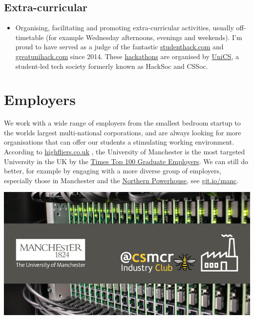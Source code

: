 \documentclass[12pt,]{book}
\providecommand{\tightlist}{%
  \setlength{\itemsep}{0pt}\setlength{\parskip}{0pt}}
\begin{document}
\hypertarget{extra-curricular}{%
\section{Extra-curricular}\label{extra-curricular}}

\begin{itemize}
\tightlist
\item
  Organising, facilitating and promoting extra-curricular activities, usually off-timetable (for example Wednesday afternoons, evenings and weekends). I'm proud to have served as a judge of the fantastic \href{https://www.studenthack.com}{studenthack.com} and \href{https://greatunihack.com}{greatunihack.com} since 2014. These \href{https://en.wikipedia.org/wiki/Hackathon}{hackathons} \citep{hafb} are organised by \href{https://www.unicsmcr.com/}{UniCS}, a student-led tech society formerly known as HackSoc and CSSoc.
\end{itemize}

\hypertarget{employers}{%
\chapter{Employers}\label{employers}}

We work with a wide range of employers from the smallest bedroom startup to the worlds largest multi-national corporations, and are always looking for more organisations that can offer our students a stimulating working environment. According to \href{https://www.highfliers.co.uk}{highfliers.co.uk} \citep{highfliers2019} \citep{times100} \citep{Birchall2019}, the University of Manchester is the most targeted University in the UK by the \href{https://www.top100graduateemployers.com}{Times Top 100 Graduate Employers}. We can still do better, for example by engaging with a more diverse group of employers, especially those in Manchester and the \href{https://northernpowerhouse.gov.uk/}{Northern Powerhouse}, see \href{https://git.io/manc}{git.io/manc}. \citep{gitmanc}

\begin{center}\includegraphics[width=1\linewidth]{images/industry-club-wide} \end{center}
\end{document}
